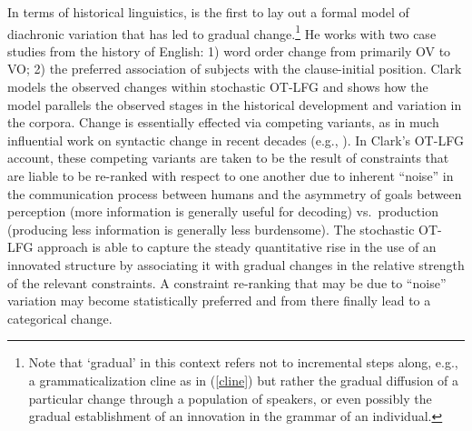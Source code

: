 \documentclass[output=paper,hidelinks]{langscibook}
\begin{document}
In terms of historical linguistics, \citet{clark2004stochastic} is the first to lay out a formal model of diachronic variation that has led to gradual change.\footnote{Note that `gradual' in this context refers not to incremental steps along, e.g., a grammaticalization cline as in (\ref{cline}) but rather the gradual diffusion of a particular change through a population of speakers, or even possibly the gradual establishment of an innovation in the grammar of an individual.}  He works with two case studies from the history of English: 1) word order change from primarily OV to VO; 2) the preferred association of  subjects with  the clause-initial position.  Clark models the observed changes within stochastic OT-LFG and shows how the model parallels the observed stages in the historical development and variation in the corpora. Change is essentially effected via competing variants, as in much influential work on syntactic change in recent decades (e.g., \citealp{kroch1989reflexes,pintzuk2003}).  In Clark's OT-LFG account, these competing variants are taken to be the result of constraints that are liable to be re-ranked with respect to one another due to inherent ``noise'' in the communication process between humans and the asymmetry of goals between perception (more information is generally useful for decoding) vs.~production (producing less information is generally less burdensome). The stochastic OT-LFG approach is able to capture the steady quantitative rise in the use of an innovated structure by associating it with gradual changes in the relative strength of the relevant constraints.  A constraint re-ranking that may be due to ``noise'' variation may become statistically preferred and from there finally lead to a categorical change. 

\end{document}
